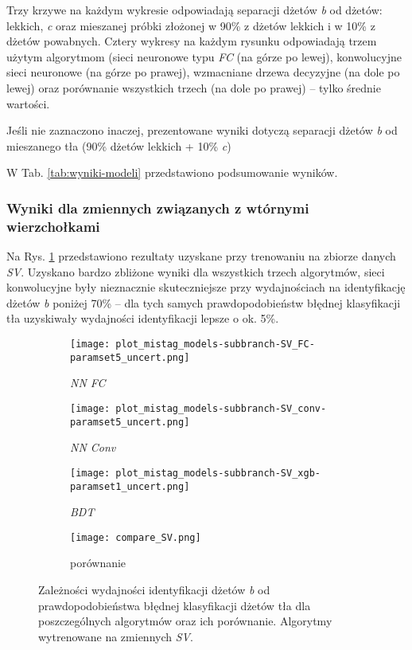 Trzy krzywe na każdym wykresie odpowiadają separacji dżetów \textit{b} od dżetów: lekkich, \textit{c} oraz mieszanej próbki złożonej w 90\% z dżetów lekkich i w 10\% z dżetów powabnych.
Cztery wykresy na każdym rysunku odpowiadają trzem użytym algorytmom (sieci neuronowe typu \textit{FC} (na górze po lewej), konwolucyjne sieci neuronowe (na górze po prawej), wzmacniane drzewa decyzyjne (na dole po lewej) oraz porównanie wszystkich trzech (na dole po prawej) -- tylko średnie wartości. 

Jeśli nie zaznaczono inaczej, prezentowane wyniki dotyczą separacji dżetów \textit{b} od mieszanego tła (90\% dżetów lekkich + 10\% \textit{c})

W Tab. \ref{tab:wyniki-modeli} przedstawiono podsumowanie wyników.

\clearpage
\FloatBarrier
\subsubsection{Wyniki dla zmiennych związanych z wtórnymi wierzchołkami}

Na Rys. \ref{fig:ROC_SV} przedstawiono rezultaty uzyskane przy trenowaniu na zbiorze danych \textit{SV}. Uzyskano bardzo zbliżone wyniki dla wszystkich trzech algorytmów, sieci konwolucyjne były nieznacznie skuteczniejsze przy wydajnościach na identyfikację dżetów \textit{b} poniżej 70\% -- dla tych samych prawdopodobieństw błędnej klasyfikacji tła uzyskiwały wydajności identyfikacji lepsze o ok. 5\%.

\begin{figure}[ht]
	\centering
    \begin{subfigure}[b]{0.49\textwidth}
	\texttt{[image: plot\_mistag\_models-subbranch-SV\_FC-paramset5\_uncert.png]}
	\caption{\textit{NN FC}}
	\end{subfigure}
    \begin{subfigure}[b]{0.49\textwidth}
	\texttt{[image: plot\_mistag\_models-subbranch-SV\_conv-paramset5\_uncert.png]}	
	\caption{\textit{NN Conv}}
	\end{subfigure}
    \begin{subfigure}[b]{0.49\textwidth}
	\texttt{[image: plot\_mistag\_models-subbranch-SV\_xgb-paramset1\_uncert.png]}
	\caption{\textit{BDT}}
	\end{subfigure}
	\begin{subfigure}[b]{0.49\textwidth}
	\texttt{[image: compare\_SV.png]}
	\caption{porównanie}
	\end{subfigure}	
	
	\caption{Zależności wydajności identyfikacji dżetów \textit{b} od prawdopodobieństwa błędnej klasyfikacji dżetów tła dla poszczególnych algorytmów oraz ich porównanie. Algorytmy wytrenowane na zmiennych \textit{SV}.}
	\label{fig:ROC_SV}
\end{figure}



